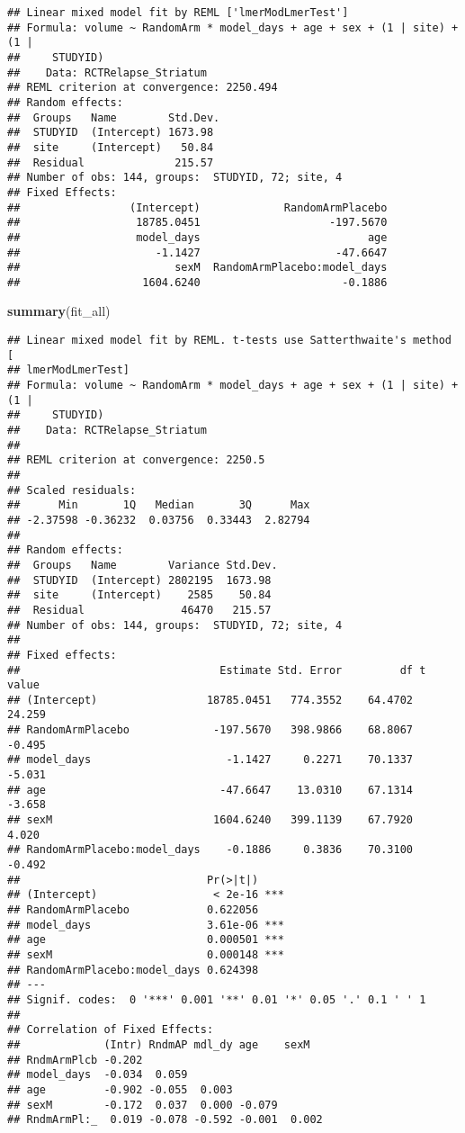 \documentclass[]{article}
\newenvironment{Shaded}{\begin{snugshade}}{\end{snugshade}}
\newcommand{\KeywordTok}[1]{\textcolor[rgb]{0.13,0.29,0.53}{\textbf{#1}}}
\newcommand{\NormalTok}[1]{#1}
\theoremstyle{definition}
\theoremstyle{definition}
\theoremstyle{definition}
\theoremstyle{remark}
\begin{document}
\begin{verbatim}
## Linear mixed model fit by REML ['lmerModLmerTest']
## Formula: volume ~ RandomArm * model_days + age + sex + (1 | site) + (1 |  
##     STUDYID)
##    Data: RCTRelapse_Striatum
## REML criterion at convergence: 2250.494
## Random effects:
##  Groups   Name        Std.Dev.
##  STUDYID  (Intercept) 1673.98 
##  site     (Intercept)   50.84 
##  Residual              215.57 
## Number of obs: 144, groups:  STUDYID, 72; site, 4
## Fixed Effects:
##                 (Intercept)             RandomArmPlacebo  
##                  18785.0451                    -197.5670  
##                  model_days                          age  
##                     -1.1427                     -47.6647  
##                        sexM  RandomArmPlacebo:model_days  
##                   1604.6240                      -0.1886
\end{verbatim}

\begin{Shaded}
\begin{Highlighting}[]
  \KeywordTok{summary}\NormalTok{(fit_all)}
\end{Highlighting}
\end{Shaded}

\begin{verbatim}
## Linear mixed model fit by REML. t-tests use Satterthwaite's method [
## lmerModLmerTest]
## Formula: volume ~ RandomArm * model_days + age + sex + (1 | site) + (1 |  
##     STUDYID)
##    Data: RCTRelapse_Striatum
## 
## REML criterion at convergence: 2250.5
## 
## Scaled residuals: 
##      Min       1Q   Median       3Q      Max 
## -2.37598 -0.36232  0.03756  0.33443  2.82794 
## 
## Random effects:
##  Groups   Name        Variance Std.Dev.
##  STUDYID  (Intercept) 2802195  1673.98 
##  site     (Intercept)    2585    50.84 
##  Residual               46470   215.57 
## Number of obs: 144, groups:  STUDYID, 72; site, 4
## 
## Fixed effects:
##                               Estimate Std. Error         df t value
## (Intercept)                 18785.0451   774.3552    64.4702  24.259
## RandomArmPlacebo             -197.5670   398.9866    68.8067  -0.495
## model_days                     -1.1427     0.2271    70.1337  -5.031
## age                           -47.6647    13.0310    67.1314  -3.658
## sexM                         1604.6240   399.1139    67.7920   4.020
## RandomArmPlacebo:model_days    -0.1886     0.3836    70.3100  -0.492
##                             Pr(>|t|)    
## (Intercept)                  < 2e-16 ***
## RandomArmPlacebo            0.622056    
## model_days                  3.61e-06 ***
## age                         0.000501 ***
## sexM                        0.000148 ***
## RandomArmPlacebo:model_days 0.624398    
## ---
## Signif. codes:  0 '***' 0.001 '**' 0.01 '*' 0.05 '.' 0.1 ' ' 1
## 
## Correlation of Fixed Effects:
##             (Intr) RndmAP mdl_dy age    sexM  
## RndmArmPlcb -0.202                            
## model_days  -0.034  0.059                     
## age         -0.902 -0.055  0.003              
## sexM        -0.172  0.037  0.000 -0.079       
## RndmArmPl:_  0.019 -0.078 -0.592 -0.001  0.002
\end{verbatim}
\end{document}
